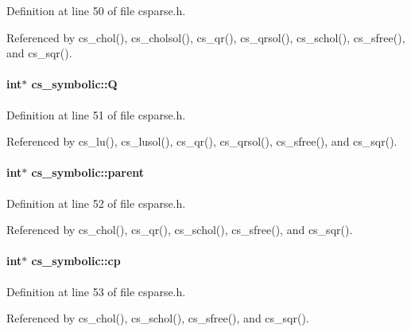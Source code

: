 Definition at line 50 of file csparse.\-h.



Referenced by cs\-\_\-chol(), cs\-\_\-cholsol(), cs\-\_\-qr(), cs\-\_\-qrsol(), cs\-\_\-schol(), cs\-\_\-sfree(), and cs\-\_\-sqr().

\hypertarget{structcs__symbolic_afcefa00ab98cf91d2258dc5a63f7dd6d}{
\paragraph[{Q}]{\setlength{\rightskip}{0pt plus 5cm}int$\ast$ cs\-\_\-symbolic\-::\-Q}}\label{structcs__symbolic_afcefa00ab98cf91d2258dc5a63f7dd6d}


Definition at line 51 of file csparse.\-h.



Referenced by cs\-\_\-lu(), cs\-\_\-lusol(), cs\-\_\-qr(), cs\-\_\-qrsol(), cs\-\_\-sfree(), and cs\-\_\-sqr().

\hypertarget{structcs__symbolic_aefc6fc6ae59f5c51b225c93a549b6838}{
\paragraph[{parent}]{\setlength{\rightskip}{0pt plus 5cm}int$\ast$ cs\-\_\-symbolic\-::parent}}\label{structcs__symbolic_aefc6fc6ae59f5c51b225c93a549b6838}


Definition at line 52 of file csparse.\-h.



Referenced by cs\-\_\-chol(), cs\-\_\-qr(), cs\-\_\-schol(), cs\-\_\-sfree(), and cs\-\_\-sqr().

\hypertarget{structcs__symbolic_a85eed6fd134282ada142ebaae0fe2403}{
\paragraph[{cp}]{\setlength{\rightskip}{0pt plus 5cm}int$\ast$ cs\-\_\-symbolic\-::cp}}\label{structcs__symbolic_a85eed6fd134282ada142ebaae0fe2403}


Definition at line 53 of file csparse.\-h.



Referenced by cs\-\_\-chol(), cs\-\_\-schol(), cs\-\_\-sfree(), and cs\-\_\-sqr().

